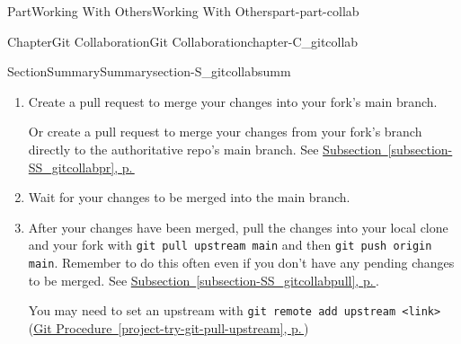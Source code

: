\documentclass[twoside,10pt,]{book}
\newcommand{\xreffont}{\relax}
\newcommand{\mono}[1]{\texttt{#1}}
\begin{document}
\begin{partptx}{Part}{Working With Others}{}{Working With Others}{}{}{part-part-collab}
\begin{chapterptx}{Chapter}{Git Collaboration}{}{Git Collaboration}{}{}{chapter-C_gitcollab}
\begin{sectionptx}{Section}{Summary}{}{Summary}{}{}{section-S_gitcollabsumm}
\begin{enumerate}
\begin{enumerate}
\item{}Stage your files with \mono{git add}. See \hyperref[subsection-SS_git-add]{Subsection~{\xreffont\ref{subsection-SS_git-add}}, p.\,\pageref{subsection-SS_git-add}} and \hyperref[project-try-git-add]{Git Procedure~{\xreffont\ref{project-try-git-add}}, p.\,\pageref{project-try-git-add}}.%
\item{}Commit your files with \mono{git commit -m}. See \hyperref[subsection-SS_git-commit]{Subsection~{\xreffont\ref{subsection-SS_git-commit}}, p.\,\pageref{subsection-SS_git-commit}} and \hyperref[project-try-git-commit]{Git Procedure~{\xreffont\ref{project-try-git-commit}}, p.\,\pageref{project-try-git-commit}}.%
\item{}Push your files back to your fork on GitHub (on your current branch) with \mono{git push origin}. See \hyperref[subsection-SS_git-push]{Subsection~{\xreffont\ref{subsection-SS_git-push}}, p.\,\pageref{subsection-SS_git-push}}, \hyperref[subsection-SS_gitcollabpush]{Subsection~{\xreffont\ref{subsection-SS_gitcollabpush}}, p.\,\pageref{subsection-SS_gitcollabpush}} and \hyperref[project-try-git-push]{Git Procedure~{\xreffont\ref{project-try-git-push}}, p.\,\pageref{project-try-git-push}}.%
\end{enumerate}
%
\item{}Create a pull request to merge your changes into your fork's main branch.%
\par
Or create a pull request to merge your changes from your fork's branch directly to the authoritative repo's main branch. See \hyperref[subsection-SS_gitcollabpr]{Subsection~{\xreffont\ref{subsection-SS_gitcollabpr}}, p.\,\pageref{subsection-SS_gitcollabpr}}%
\item{}Wait for your changes to be merged into the main branch.%
\item{}After your changes have been merged, pull the changes into your local clone and your fork with \mono{git pull upstream main} and then \mono{git push origin main}. Remember to do this often even if you don't have any pending changes to be merged. See \hyperref[subsection-SS_gitcollabpull]{Subsection~{\xreffont\ref{subsection-SS_gitcollabpull}}, p.\,\pageref{subsection-SS_gitcollabpull}}.%
\par
You may need to set an upstream with \mono{git remote add upstream <link>} (\hyperref[project-try-git-pull-upstream]{Git Procedure~{\xreffont\ref{project-try-git-pull-upstream}}, p.\,\pageref{project-try-git-pull-upstream}})%
\end{enumerate}

\end{sectionptx}
\end{chapterptx}
\end{partptx}
\end{document}

